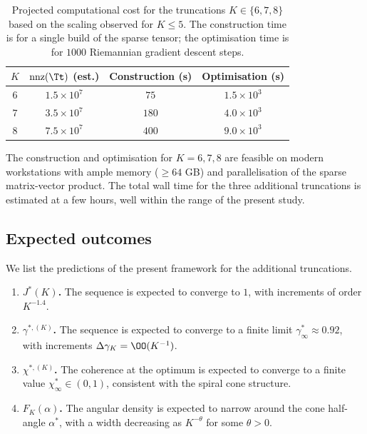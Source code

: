 \begin{table}[h]
\centering
\caption{Projected computational cost for the truncations 
$K\in\{6,7,8\}$ based on the scaling observed for $K\leq5$. The 
construction time is for a single build of the sparse tensor; the 
optimisation time is for $1000$ Riemannian gradient descent steps.}
\label{part-5:tab:cost}
\begin{tabular}{cccc}
\toprule
$K$ & $\operatorname{nnz}(\Tt)$ (est.) & Construction (s) & 
Optimisation (s) \\
\midrule
$6$ & $1.5\times10^7$ & $75$ & $1.5\times10^3$ \\
$7$ & $3.5\times10^7$ & $180$ & $4.0\times10^3$ \\
$8$ & $7.5\times10^7$ & $400$ & $9.0\times10^3$ \\
\bottomrule
\end{tabular}
\end{table}

\begin{remark}[Feasibility]\label{part-5:rem:feasibility}
The construction and optimisation for $K=6,7,8$ are feasible on 
modern workstations with ample memory ($\geq 64$ GB) and 
parallelisation of the sparse matrix-vector product. The total wall 
time for the three additional truncations is estimated at a few 
hours, well within the range of the present study.
\end{remark}

\subsection{Expected outcomes}
\label{part-5:ssec:expected}

We list the predictions of the present framework for the additional 
truncations.

\begin{enumerate}[label=(\arabic*),leftmargin=*]
\item \textbf{$J^\ast(K)$.} The sequence is expected to converge to 
      $1$, with increments of order $K^{-1.4}$.
\item \textbf{$\gamma^{\ast,(K)}$.} The sequence is expected to 
      converge to a finite limit $\gamma^\ast_\infty\approx0.92$, 
      with increments $\Delta\gamma_K = \OO(K^{-1})$.
\item \textbf{$\chi^{\ast,(K)}$.} The coherence at the optimum is 
      expected to converge to a finite value 
      $\chi^\ast_\infty\in(0,1)$, consistent with the spiral cone 
      structure.
\item \textbf{$F_K(\alpha)$.} The angular density is expected to 
      narrow around the cone half-angle $\alpha^\ast$, with a width 
      decreasing as $K^{-\theta}$ for some $\theta>0$.
\end{enumerate}

